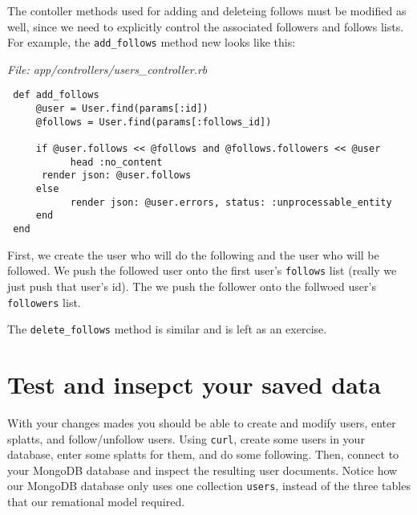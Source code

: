 \documentclass{article}
\begin{document}
The contoller methods used for adding and deleteing follows must be modified as well, since we need to explicitly control the associated followers and follows lists.  For example, the \texttt{add\_follows} method new looks like this:

\newpage

\emph{File: app/controllers/users\_controller.rb}

\begin{verbatim}
 def add_follows
     @user = User.find(params[:id])
     @follows = User.find(params[:follows_id])

     if @user.follows << @follows and @follows.followers << @user
           head :no_content
	  render json: @user.follows
     else
           render json: @user.errors, status: :unprocessable_entity
     end
 end
 \end{verbatim}

First, we create the user who will do the following and the user who will be followed.  We push the followed user onto the first user's \texttt{follows} list (really we just push that user's id).  The we push the follower onto the follwoed user's \texttt{followers} list.

The \texttt{delete\_follows} method is similar and is left as an exercise.

\section{Test and insepct your saved data}
With your changes mades you should be able to create and modify users, enter splatts, and follow/unfollow users.  Using \texttt{curl}, create some users in your database, enter some splatts for them, and do some following.  Then, connect to your MongoDB database and inspect the resulting user documents.  Notice how our MongoDB database only uses one collection \texttt{users}, instead of the three tables that our remational model required.
\end{document}
